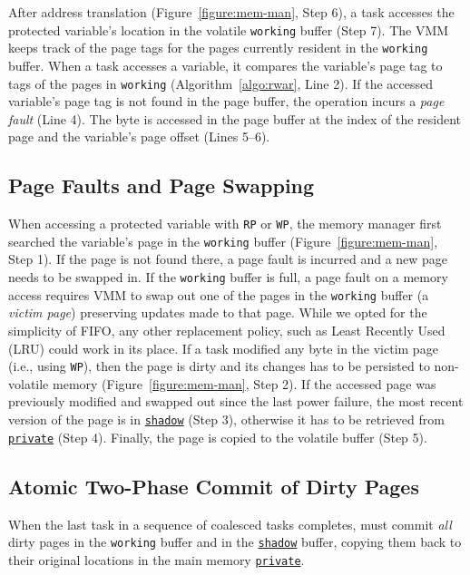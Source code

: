 After address translation (Figure~\ref{figure:mem-man}, Step 6), a task accesses the protected variable's location in the volatile \texttt{working} buffer (Step 7). The VMM keeps track of the page tags for the pages currently resident in the \texttt{working} buffer. When a task accesses a variable, it compares the variable's page tag to tags of the pages in {\tt working} (Algorithm~\ref{algo:rwar}, Line 2). If the accessed variable's page tag is not found in the page buffer, the operation incurs a {\em page fault} (Line 4). The byte is accessed in the page buffer at the index of the resident page and the variable's page offset (Lines 5--6).

\subsection{Page Faults and Page Swapping}

When accessing a protected variable with \texttt{RP} or \texttt{WP}, the memory manager first searched the variable's page in the \texttt{working} buffer (Figure~\ref{figure:mem-man}, Step 1). If the page is not found there, a page fault is incurred and a new page needs to
be swapped in. If the \texttt{working} buffer is full, a page fault on a memory access requires VMM to swap out one of the pages in the \texttt{working} buffer (a \emph{victim page}) preserving updates made to that page. While we opted for the simplicity of FIFO, any other replacement policy, such as Least Recently Used (LRU) could work in its place. If a task modified any byte in the victim page (i.e., using \texttt{WP}), then the page is dirty and its changes has to be persisted to non-volatile memory (Figure~\ref{figure:mem-man}, Step 2). If the accessed page was previously modified and swapped out since the last power failure, the most recent version of the page is in {\tt \underline{shadow}} (Step 3), otherwise it has to be retrieved from {\tt \underline{private}} (Step 4). Finally, the page is copied to the volatile buffer (Step 5).

\subsection{Atomic Two-Phase Commit of Dirty Pages}

When the last task in a sequence of coalesced tasks completes, \sys must commit \emph{all} dirty pages in the \texttt{working} buffer and in the \texttt{\underline{shadow}} buffer, copying them back to their original locations in the main memory \texttt{\underline{private}}. 

